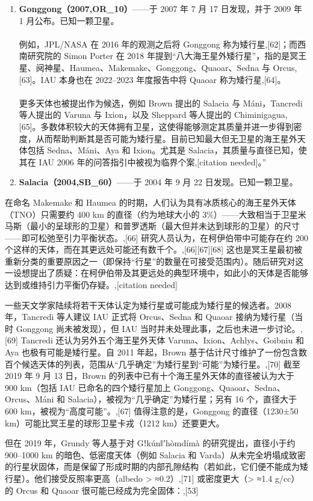 \begin{enumerate}
\item \textbf{Gonggong（2007,OR_{10}）}——于 2007 年 7 月 17 日发现，并于 2009 年 1 月公布。已知一颗卫星。\\\\
例如，JPL/NASA 在 2016 年的观测之后将 Gonggong 称为矮行星,[62]；而西南研究院的 Simon Porter 在 2018 年提到“八大海王星外矮行星”，指的是冥王星、阋神星、Haumea、Makemake、Gonggong、Quaoar、Sedna 与 Orcus,[63]。IAU 本身也在 2022–2023 年度报告中将 Quaoar 称为矮行星,[64]。\\\\
更多天体也被提出作为候选，例如 Brown 提出的 Salacia 与 Máni，Tancredi 等人提出的 Varuna 与 Ixion，以及 Sheppard 等人提出的 Chiminigagua,[65]。多数体积较大的天体拥有卫星，这使得能够测定其质量并进一步得到密度，从而帮助判断其是否可能为矮行星。目前已知最大但无卫星的海王星外天体包括 Sedna、Máni、Aya 和 Ixion。尤其是 Salacia，其质量与直径已知，使其在 IAU 2006 年的问答指引中被视为临界个案,[citation needed]。”
\item \textbf{Salacia（2004,SB_{60}）}——于 2004 年 9 月 22 日发现。已知一颗卫星。
\end{enumerate}
在命名 Makemake 和 Haumea 的时期，人们认为具有冰质核心的海王星外天体（TNO）只需要约 400 km 的直径（约为地球大小的 3\%）——大致相当于卫星米马斯（最小的呈球形的卫星）和普罗透斯（最大但并未达到球形的卫星）的尺寸——即可松弛至引力平衡状态。,[66] 研究人员认为，在柯伊伯带中可能存在约 200 个这样的天体，而在其更远处可能还有数千个。,[66][67][68] 这也是冥王星最初被重新分类的重要原因之一（即保持“行星”的数量在可接受范围内）。随后研究对这一设想提出了质疑：在柯伊伯带及其更远处的典型环境中，如此小的天体是否能够达到或维持引力平衡仍存疑。,[citation needed]

一些天文学家陆续将若干天体认定为矮行星或可能成为矮行星的候选者。2008 年，Tancredi 等人建议 IAU 正式将 Orcus、Sedna 和 Quaoar 接纳为矮行星（当时 Gonggong 尚未被发现），但 IAU 当时并未处理此事，之后也未进一步讨论。,[69] Tancredi 还认为另外五个海王星外天体 Varuna、Ixion、Achlys、Goibniu 和 Aya 也极有可能是矮行星。自 2011 年起，Brown 基于估计尺寸维护了一份包含数百个候选天体的列表，范围从“几乎确定”为矮行星到“可能”为矮行星。,[70] 截至 2019 年 9 月 13 日，Brown 的列表中已有十个海王星外天体的直径被认为大于 900 km（包括 IAU 已命名的四个矮行星加上 Gonggong、Quaoar、Sedna、Orcus、Máni 和 Salacia），被视为“几乎确定”为矮行星；另有 16 个，直径大于 600 km，被视为“高度可能”。,[67] 值得注意的是，Gonggong 的直径（1230±50 km）可能比冥王星的球形卫星卡戎（1212 km）还要更大。

但在 2019 年，Grundy 等人基于对 Gǃkúnǁʼhòmdímà 的研究提出，直径小于约 900–1000 km 的暗色、低密度天体（例如 Salacia 和 Varda）从未完全坍塌成致密的行星状固体，而是保留了形成时期的内部孔隙结构（若如此，它们便不能成为矮行星）。他们接受反照率更高（albedo > ≈0.2）,[71] 或密度更大（> ≈1.4 g/cc） 的 Orcus 和 Quaoar 很可能已经成为完全固体：,[53]

